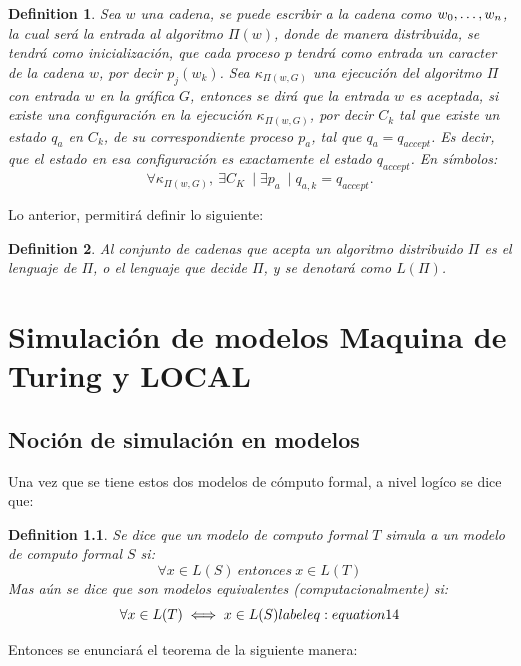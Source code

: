 \documentclass[10pt]{report}
\newtheorem{definition}{Definition}
\begin{document}
    \theoremstyle{definition}
    \begin{definition}
        Sea $w$ una cadena, se puede escribir a la cadena como $w_{0},\mathellipsis, w_{n}$, la cual será la entrada al algoritmo
        $\Pi(w)$, donde de manera distribuida, se tendrá como inicialización, que cada proceso $p$ tendrá como entrada un caracter de la cadena $w$, por decir $p_{j}(w_{k})$.\newline
        Sea $\kappa_{\Pi(w,G)}$ una ejecución del algoritmo $\Pi$ con entrada $w$ en la gráfica $G$, entonces se dirá que
        la entrada $w$ es aceptada, si existe una configuración en la ejecución $\kappa_{\Pi(w,G)}$, por decir $C_{k}$ tal que
        existe un estado $q_{a}$ en $C_{k}$, de su correspondiente proceso $p_{a}$, tal que $q_{a}=q_{accept}$.\newline
        Es decir, que el estado en esa configuración es exactamente el estado $q_{accept}$.\newline
        En símbolos:
        \begin{equation}
            \forall \kappa_{\Pi(w,G)},\ \exists C_{K}\ \mid \exists p_{a}\ \mid q_{a,k}=q_{accept}.\label{eq:equation4}
        \end{equation}
    \end{definition}

    Lo anterior, permitirá definir lo siguiente:
    \begin{definition}
        Al conjunto de cadenas que acepta un algoritmo distribuido $\Pi$ es el lenguaje
        de $\Pi$, o el lenguaje que decide $\Pi$, y se denotará como $L(\Pi)$.
    \end{definition}


    \chapter{Simulación de modelos Maquina de Turing y \textbf{LOCAL}}\label{ch:simulacion-de-modelostextbfytextbf}
    \section{Noción de simulación en modelos}\label{sec:nocion-de-simulación-en-modelos}
    Una vez que se tiene estos dos modelos de cómputo formal, a nivel logíco se dice que:
    \theoremstyle{definition}
    \begin{definition}
        Se dice que un modelo de computo formal $T$ simula a un modelo de computo formal  $S$ si:
        \begin{equation}
        \forall x\in L(S) \ entonces \ x\in L(T)\label{eq:equation13}
        \end{equation}
        Mas aún se dice que son modelos equivalentes (computacionalmente) si:
        \begin{equation}
        \forall x\in L(T) \iff x\in L(S) \\label{eq:equation14}
        \end{equation}
    \end{definition}
    \space
    Entonces se enunciará el teorema de la siguiente manera:
\end{document}

